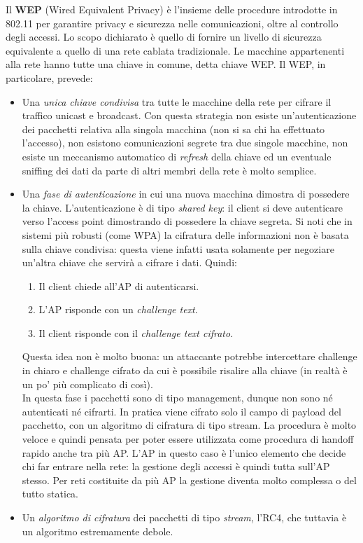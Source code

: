 Il \textbf{WEP} (Wired Equivalent Privacy) è l'insieme delle procedure introdotte in 802.11 per garantire privacy e sicurezza nelle comunicazioni, oltre al controllo degli accessi. Lo scopo dichiarato è quello di fornire un livello di sicurezza equivalente a quello di una rete cablata tradizionale. Le macchine appartenenti alla rete hanno tutte una chiave in comune, detta chiave WEP. Il WEP, in particolare, prevede:
\begin{itemize}
	\item Una \textit{unica chiave condivisa} tra tutte le macchine della rete per cifrare il traffico unicast e broadcast. Con questa strategia non esiste un'autenticazione dei pacchetti relativa alla singola macchina (non si sa chi ha effettuato l'accesso), non esistono comunicazioni segrete tra due singole macchine, non esiste un meccanismo automatico di \textit{refresh} della chiave ed un eventuale sniffing dei dati da parte di altri membri della rete è molto semplice.
	\item Una \textit{fase di autenticazione} in cui una nuova macchina dimostra di possedere la chiave. L'autenticazione è di tipo \textit{shared key}: il client si deve autenticare verso l'access point dimostrando di possedere la chiave segreta. Si noti che in sistemi più robusti (come WPA) la cifratura delle informazioni non è basata sulla chiave condivisa: questa viene infatti usata solamente per negoziare un'altra chiave che servirà a cifrare i dati. Quindi:
	\begin{enumerate}
		\item Il client chiede all'AP di autenticarsi.
		\item L'AP risponde con un \textit{challenge text}.
		\item Il client risponde con il \textit{challenge text cifrato}.
	\end{enumerate}
Questa idea non è molto buona: un attaccante potrebbe intercettare challenge in chiaro e challenge cifrato da cui è possibile risalire alla chiave (in realtà è un po' più complicato di così).\\
In questa fase i pacchetti sono di tipo management, dunque non sono né autenticati né cifrarti. In pratica viene cifrato solo il campo di payload del pacchetto, con un algoritmo di cifratura di tipo stream. La procedura è molto veloce e quindi pensata per poter essere utilizzata come procedura di handoff rapido anche tra più AP. L'AP in questo caso è l'unico elemento che decide chi far entrare nella rete: la gestione degli accessi è quindi tutta sull'AP stesso. Per reti costituite da più AP la gestione diventa molto complessa o del tutto statica.
	\item Un \textit{algoritmo di cifratura} dei pacchetti di tipo \textit{stream}, l'RC4, che tuttavia è un algoritmo estremamente debole.
\end{itemize}
